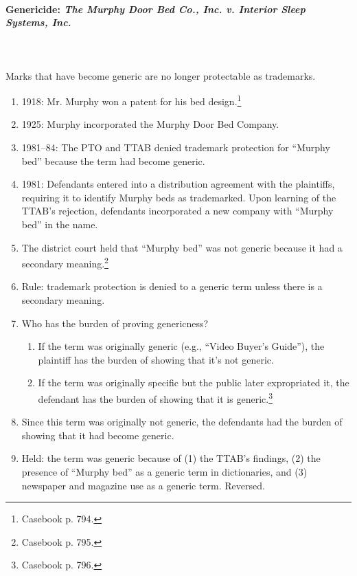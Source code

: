 \paragraph{Genericide: \emph{The Murphy Door Bed Co., Inc. v. Interior Sleep Systems, Inc.}}
~\\\\
Marks that have become generic are no longer protectable as trademarks.

\begin{enumerate}
    \item 1918: Mr. Murphy won a patent for his bed design.\footnote{Casebook 
    p. 794.}
    \item 1925: Murphy incorporated the Murphy Door Bed Company.
    \item 1981--84: The PTO and TTAB denied trademark protection for ``Murphy 
    bed'' because the term had become generic.
    \item 1981: Defendants entered into a distribution agreement with the 
    plaintiffs, requiring it to identify Murphy beds as trademarked. Upon 
    learning of the TTAB's rejection, defendants incorporated a new company 
    with ``Murphy bed'' in the name.
    \item The district court held that ``Murphy bed'' was not generic because 
    it had a secondary meaning.\footnote{Casebook p. 795.}
    \item Rule: trademark protection is denied to a generic term unless there 
    is a secondary meaning.
    \item Who has the burden of proving genericness?
    \begin{enumerate}
        \item If the term was originally generic (e.g., ``Video Buyer's 
        Guide''), the plaintiff has the burden of showing that it's not 
        generic.
        \item If the term was originally specific but the public later 
        expropriated it, the defendant has the burden of showing that it is 
        generic.\footnote{Casebook p. 796.}
    \end{enumerate}
    \item Since this term was originally not generic, the defendants had the 
    burden of showing that it had become generic.
    \item Held: the term was generic because of (1) the TTAB's findings, (2) 
    the presence of ``Murphy bed'' as a generic term in dictionaries, and (3) 
    newspaper and magazine use as a generic term. Reversed.
\end{enumerate}

